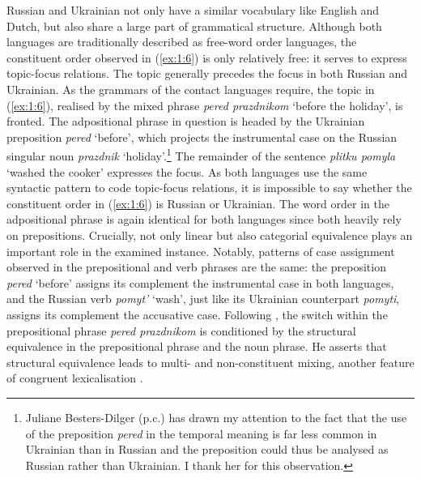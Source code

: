 \noindent Russian and Ukrainian not only have a similar vocabulary like English and Dutch, but also share a large part of grammatical structure. Although both languages are traditionally described as free-word order languages, the constituent order observed in (\ref{ex:1:6}) is only relatively free: it serves to express  topic-focus relations. The topic generally precedes the focus in both Russian and Ukrainian. As the grammars of the contact languages require, the topic in (\ref{ex:1:6}), realised by the mixed phrase \textit{pered prazdnikom} 
`before the holiday', is fronted. The adpositional phrase in question is headed by the Ukrainian preposition \textit{pered}  `before', which projects the instrumental case on the Russian singular noun \textit{prazdnik} `holiday'.\footnote{Juliane Besters-Dilger (p.c.) has drawn my attention to the fact that the use of the preposition \textit{pered} in the temporal meaning is far less common in Ukrainian than in Russian and the preposition could thus be analysed as Russian rather than Ukrainian. I thank her for this observation.} The remainder of the sentence \textit{plitku pomyla} `washed the cooker' expresses the focus. As both languages use the same syntactic pattern to code topic-focus relations, it is impossible to say whether the constituent order in (\ref{ex:1:6}) is Russian or Ukrainian. The word order in the adpositional phrase is again identical for both languages since both heavily rely on prepositions. Crucially, not only linear but also categorial equivalence plays an important role in the examined instance. Notably, patterns of case assignment observed in the prepositional and verb phrases are the same: the preposition \textit{pered} `before' assigns its complement the instrumental case in both languages, and the Russian verb \textit{pomyt'} `wash', just like its Ukrainian counterpart \textit{pomyti}, assigns its complement the accusative case. Following \citet[129]{muysken-bilingual-2000}, the switch within the prepositional phrase \textit{pered prazdnikom} is conditioned by the structural equivalence in the prepositional phrase and the noun phrase. He asserts that structural equivalence leads to multi- and non-constituent mixing, another feature of congruent lexicalisation \citep[129]{muysken-bilingual-2000}. 

